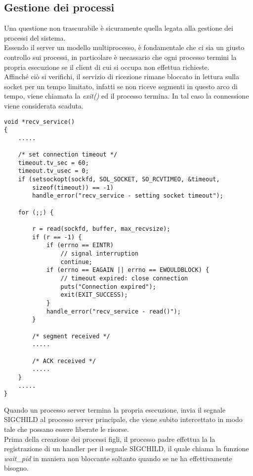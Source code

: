 \subsection{Gestione dei processi}
Una questione non trascurabile è sicuramente quella legata alla gestione
dei processi del sistema.\\
Essendo il server un modello multiprocesso, è fondamentale che ci sia un 
giusto controllo sui processi, in particolare è necassario che ogni 
processo termini la propria esecuzione se il client di cui si occupa non
effettua richieste.\\
Affinché ciò si verifichi, il servizio di ricezione rimane bloccato in 
lettura sulla socket per un tempo limitato, infatti se non riceve segmenti
in questo arco di tempo, viene chiamata la \emph{exit()} ed il processo 
termina. In tal caso la connessione viene considerata scaduta.
\begin{lstlisting}[title=transport.c]
void *recv_service()
{
    .....

    /* set connection timeout */
    timeout.tv_sec = 60;
    timeout.tv_usec = 0;
    if (setsockopt(sockfd, SOL_SOCKET, SO_RCVTIMEO, &timeout, 
        sizeof(timeout)) == -1)
        handle_error("recv_service - setting socket timeout");

    for (;;) {

        r = read(sockfd, buffer, max_recvsize);
        if (r == -1) {
            if (errno == EINTR)
                // signal interruption
                continue;
            if (errno == EAGAIN || errno == EWOULDBLOCK) {
                // timeout expired: close connection
                puts("Connection expired");
                exit(EXIT_SUCCESS);
            }
            handle_error("recv_service - read()");
        }

        /* segment received */
        .....

        /* ACK received */
        .....
    }
    .....
}
\end{lstlisting}
Quando un processo server termina la propria esecuzione, invia il segnale
SIGCHILD al processo server principale, che viene subito intercettato in 
modo tale che possano essere liberate le risorse.\\
Prima della creazione dei processi figli, il processo padre effettua la
la registrazione di un handler per il segnale SIGCHILD, il quale 
chiama la funzione  \emph{wait\_pid} in maniera non bloccante soltanto quando 
se ne ha effettivamente bisogno.
